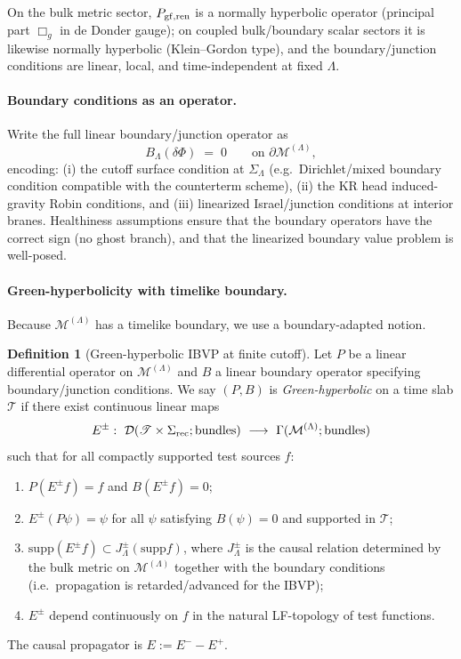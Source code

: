 \documentclass[10pt]{article}
\theoremstyle{definition}
\newtheorem{definition}{Definition}[section]
\theoremstyle{plain}
\begin{document}
On the bulk metric sector, $P_{\rm gf,ren}$ is a normally hyperbolic operator (principal part $\Box_{g}$ in de Donder gauge);
on coupled bulk/boundary scalar sectors it is likewise normally hyperbolic (Klein--Gordon type), and the boundary/junction conditions
are linear, local, and time-independent at fixed $\Lambda$.

\paragraph{Boundary conditions as an operator.}
Write the full linear boundary/junction operator as
\begin{equation}
B_\Lambda(\delta\Phi)\;=\;0\qquad\text{on }\partial\mathcal M^{(\Lambda)},
\label{eq:BC-operator}
\end{equation}
encoding:
(i) the cutoff surface condition at $\Sigma_\Lambda$ (e.g.\ Dirichlet/mixed boundary condition compatible with the counterterm scheme),
(ii) the KR head induced-gravity Robin conditions,
and (iii) linearized Israel/junction conditions at interior branes.
Healthiness assumptions ensure that the boundary operators have the correct sign (no ghost branch), and that the linearized boundary value
problem is well-posed.

\paragraph{Green-hyperbolicity with timelike boundary.}
Because $\mathcal M^{(\Lambda)}$ has a timelike boundary, we use a boundary-adapted notion.

\begin{definition}[Green-hyperbolic IBVP at finite cutoff]
\label{def:green-hyp-bvp}
Let $P$ be a linear differential operator on $\mathcal M^{(\Lambda)}$ and $B$ a linear boundary operator specifying boundary/junction
conditions.  We say $(P,B)$ is \emph{Green-hyperbolic} on a time slab $\mathscr T$ if there exist continuous linear maps
\[
E^\pm:\ \mathcal D(\mathscr T\times\Sigma_{\rm rec};\text{bundles})\ \longrightarrow\ \Gamma(\mathcal M^{(\Lambda)};\text{bundles})
\]
such that for all compactly supported test sources $f$:
\begin{enumerate}[label=(\roman*),leftmargin=2.0em,itemsep=1pt]
\item $P(E^\pm f)=f$ and $B(E^\pm f)=0$;
\item $E^\pm(P\psi)=\psi$ for all $\psi$ satisfying $B(\psi)=0$ and supported in $\mathscr T$;
\item $\mathrm{supp}(E^\pm f)\subset J^\pm_{\Lambda}(\mathrm{supp} f)$, where $J^\pm_{\Lambda}$ is the causal relation determined by
the bulk metric on $\mathcal M^{(\Lambda)}$ together with the boundary conditions (i.e.\ propagation is retarded/advanced for the IBVP);
\item $E^\pm$ depend continuously on $f$ in the natural LF-topology of test functions.
\end{enumerate}
The causal propagator is $E:=E^- - E^+$.
\end{definition}
\end{document}
